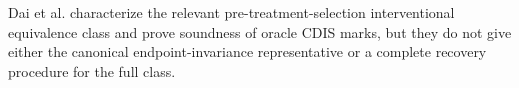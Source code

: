 Dai et al. characterize the relevant pre-treatment-selection interventional equivalence class and prove soundness of oracle CDIS marks, but they do not give either the canonical endpoint-invariance representative or a complete recovery procedure for the full class.